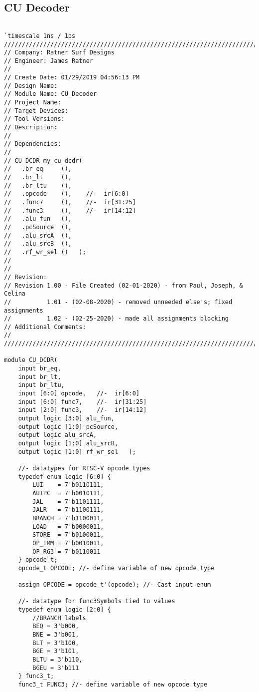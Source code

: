 \documentclass{article}
\begin{document}
\pagebreak

\subsection{CU Decoder}

\begin{verbatim}

`timescale 1ns / 1ps
//////////////////////////////////////////////////////////////////////////////////
// Company: Ratner Surf Designs
// Engineer: James Ratner
// 
// Create Date: 01/29/2019 04:56:13 PM
// Design Name: 
// Module Name: CU_Decoder
// Project Name: 
// Target Devices: 
// Tool Versions: 
// Description: 
// 
// Dependencies:
// 
// CU_DCDR my_cu_dcdr(
//   .br_eq     (), 
//   .br_lt     (), 
//   .br_ltu    (),
//   .opcode    (),    //-  ir[6:0]
//   .func7     (),    //-  ir[31:25]
//   .func3     (),    //-  ir[14:12] 
//   .alu_fun   (),
//   .pcSource  (),
//   .alu_srcA  (),
//   .alu_srcB  (), 
//   .rf_wr_sel ()   );
//
// 
// Revision:
// Revision 1.00 - File Created (02-01-2020) - from Paul, Joseph, & Celina
//          1.01 - (02-08-2020) - removed unneeded else's; fixed assignments
//          1.02 - (02-25-2020) - made all assignments blocking
// Additional Comments:
// 
//////////////////////////////////////////////////////////////////////////////////

module CU_DCDR(
    input br_eq, 
    input br_lt, 
    input br_ltu,
    input [6:0] opcode,   //-  ir[6:0]
    input [6:0] func7,    //-  ir[31:25]
    input [2:0] func3,    //-  ir[14:12] 
    output logic [3:0] alu_fun,
    output logic [1:0] pcSource,
    output logic alu_srcA,
    output logic [1:0] alu_srcB, 
    output logic [1:0] rf_wr_sel   );
    
    //- datatypes for RISC-V opcode types
    typedef enum logic [6:0] {
        LUI    = 7'b0110111,
        AUIPC  = 7'b0010111,
        JAL    = 7'b1101111,
        JALR   = 7'b1100111,
        BRANCH = 7'b1100011,
        LOAD   = 7'b0000011,
        STORE  = 7'b0100011,
        OP_IMM = 7'b0010011,
        OP_RG3 = 7'b0110011
    } opcode_t;
    opcode_t OPCODE; //- define variable of new opcode type
    
    assign OPCODE = opcode_t'(opcode); //- Cast input enum 

    //- datatype for func3Symbols tied to values
    typedef enum logic [2:0] {
        //BRANCH labels
        BEQ = 3'b000,
        BNE = 3'b001,
        BLT = 3'b100,
        BGE = 3'b101,
        BLTU = 3'b110,
        BGEU = 3'b111
    } func3_t;    
    func3_t FUNC3; //- define variable of new opcode type
    

\end{verbatim}
\end{document}
